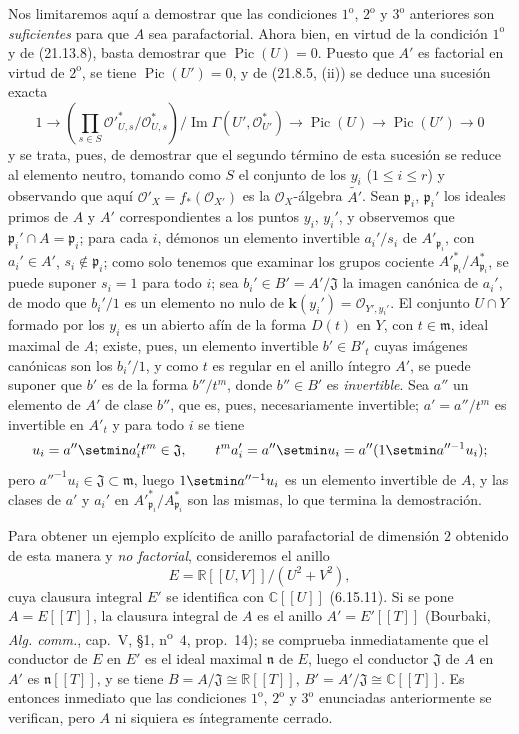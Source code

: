 \begin{env}[21.13.9]
Nos limitaremos aquí a demostrar que las condiciones $1^{\mathrm o}$,
$2^{\mathrm o}$ y $3^{\mathrm o}$ anteriores son \emph{suficientes} para que $A$ sea
parafactorial. Ahora bien, en virtud de la condición $1^{\mathrm o}$ y de (21.13.8), basta
demostrar que $\operatorname{Pic}(U)=0$. Puesto que $A'$ es factorial en virtud de
$2^{\mathrm o}$, se tiene $\operatorname{Pic}(U')=0$, y de (21.8.5, (ii)) se deduce una
sucesión exacta
\[
  1\longrightarrow
  \left(\prod_{s\in S}
  \mathcal O'^*_{U,s}/\mathcal O^*_{U,s}\right)
  \big/\operatorname{Im}\Gamma(U',\mathcal O_{U'}^*)
  \longrightarrow\operatorname{Pic}(U)\longrightarrow\operatorname{Pic}(U')
  \longrightarrow0
\]
y se trata, pues, de demostrar que el segundo término de esta sucesión se reduce al elemento
neutro, tomando como $S$ el conjunto de los $y_i$ ($1\leq i\leq r$) y observando
que aquí $\mathcal O'_X=f_*(\mathcal O_{X'})$ es la $\mathcal O_X$-álgebra $\widetilde{A'}$. Sean
$\mathfrak p_i$, $\mathfrak p_i'$ los ideales primos de $A$ y $A'$ correspondientes
a los puntos $y_i$, $y_i'$, y observemos que $\mathfrak p_i'\cap A=\mathfrak p_i$;
para cada $i$, démonos un elemento invertible $a_i'/s_i$ de
$A'_{\mathfrak p_i}$, con $a_i'\in A'$, $s_i\notin\mathfrak p_i$; como solo
tenemos que examinar los grupos cociente
$A'^*_{\mathfrak p_i}/A^*_{\mathfrak p_i}$, se puede suponer $s_i=1$ para todo
$i$; sea $b_i'\in B'=A'/\mathfrak J$ la imagen canónica de $a_i'$, de modo que
$b_i'/1$ es un elemento no nulo de $\boldsymbol k(y_i')=\mathcal O_{Y',y_i'}$. El conjunto
$U\cap Y$ formado por los $y_i$ es un abierto afín de la forma $D(t)$ en $Y$, con
$t\in\mathfrak m$, ideal maximal de $A$; existe, pues, un elemento invertible
$b'\in B'_t$ cuyas imágenes canónicas son los $b_i'/1$, y como $t$ es regular
en el anillo íntegro $A'$, se puede suponer que $b'$ es de la forma $b''/t^m$, donde
$b''\in B'$ es \emph{invertible}. Sea $a''$ un elemento de $A'$ de clase $b''$, que
es, pues, necesariamente invertible; $a'=a''/t^m$ es invertible en $A'_t$ y para
todo $i$ se tiene
\[
  u_i=a''\setmin a_i't^m\in\mathfrak J,
  \qquad
  t^m a_i'=a''\setmin u_i=a''(1\setmin a''^{-1}u_i);
\]
pero $a''^{-1}u_i\in\mathfrak J\subset\mathfrak m$, luego $1\setmin a''^{-1}u_i$ es un
elemento invertible de $A$, y las clases de $a'$ y $a_i'$ en
$A'^*_{\mathfrak p_i}/A^*_{\mathfrak p_i}$ son las mismas, lo que termina la
demostración.

Para obtener un ejemplo explícito de anillo parafactorial de dimensión $2$ obtenido de
esta manera y \emph{no factorial}, consideremos el anillo
\[
  E=\mathbb R[[U,V]]/(U^2+V^2),
\]
cuya clausura integral $E'$ se identifica con $\mathbb C[[U]]$ (6.15.11). Si se pone
$A=E[[T]]$, la clausura integral de $A$ es el anillo $A'=E'[[T]]$ (Bourbaki,
\emph{Alg. comm.}, cap.~V, \S1, n\textsuperscript{o}~4, prop.~14); se comprueba
inmediatamente que el conductor de $E$ en $E'$ es el ideal maximal $\mathfrak n$ de
$E$, luego el conductor $\mathfrak J$ de $A$ en $A'$ es $\mathfrak n[[T]]$, y se
tiene $B=A/\mathfrak J\cong\mathbb R[[T]]$, $B'=A'/\mathfrak J\cong\mathbb C[[T]]$.
Es entonces inmediato que las condiciones $1^{\mathrm o}$, $2^{\mathrm o}$ y
$3^{\mathrm o}$ enunciadas anteriormente se verifican, pero $A$ ni siquiera es
íntegramente cerrado.


\end{env}
